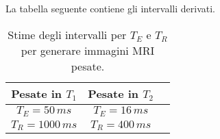 La tabella seguente contiene gli intervalli derivati.


\begin{table}[h]
	\centering
	\begin{tabular}{ccc}
	\toprule
		\textbf{Pesate in $T_1$} &	\textbf{Pesate in $T_2$}	\\
	\midrule
		$T_E = 50\,ms$			&		$T_E = 16\,ms$	 \\	
		$T_R = 1000\,ms$			&		$T_R = 400\,ms$ \\
	\bottomrule
	\end{tabular}
	\caption{Stime degli intervalli per $T_E$ e $T_R$ per generare immagini MRI pesate.}	
	\label{tab:Pesate}
\end{table}
